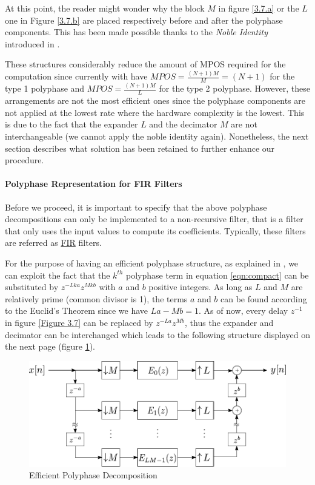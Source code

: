 At this point, the reader might wonder why the block $M$ in figure \ref{3.7.a} or the $L$ one in Figure \ref{3.7.b} are placed respectively before and after the polyphase components. This has been made possible thanks to the \textit{Noble Identity} introduced in \cite[p.~204-205]{Oppenheim}.

These structures considerably reduce the amount of MPOS required for the computation since currently with have $MPOS = \frac{(N+1)M}{M} = (N+1)$ for the type 1 polyphase and $MPOS = \frac{(N+1)M}{L} $ for the type 2 polyphase. However, these arrangements are not the most efficient ones since the polyphase components are not applied at the lowest rate where the hardware complexity is the lowest. This is due to the fact that the expander $L$ and the decimator $M$ are not interchangeable (we cannot apply the noble identity again). Nonetheless, the next section describes what solution has been retained to further enhance our procedure.

\newpage

\paragraph{Polyphase Representation for FIR Filters}
\justify

Before we proceed, it is important to specify that the above polyphase decompositions can only be implemented to a non-recursive filter, that is a filter that only uses the input values to compute its coefficients. Typically, these filters are referred as \hyperlink{FIR}{FIR} filters. 

For the purpose of having an efficient polyphase structure, as explained in \cite{vaidyanathan}, we can exploit the fact that the  $k^{th}$ polyphase term in equation \ref{eqn:compact} can be substituted by $z^{-Lka}z^{Mkb}$ with $a$ and $b$ positive integers. As long as $L$ and $M$ are relatively prime (common divisor is 1), the terms $a$ and $b$ can be found according to the Euclid's Theorem since we have $La-Mb=1$. As of now, every delay $z^{-1}$ in figure \ref{Figure 3.7} can be replaced by $z^{-La}z^{Mb}$, thus the expander and decimator can be interchanged which leads to the following structure displayed on the next page (figure \ref{Figure 3.8}).

\begin{figure}[ht!]
	\centering
	\includegraphics[scale=0.95]{polyphase_direct_efficient.pdf}
	\vspace*{1mm}
	\caption{Efficient Polyphase Decomposition}
	\label{Figure 3.8}
\end{figure}



